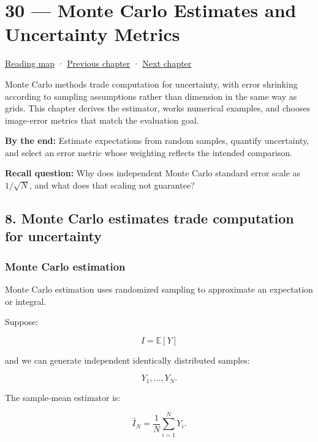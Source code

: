 \hypertarget{02-foundations-ii-ch030}{}
\chapter{30 --- Monte Carlo Estimates and Uncertainty Metrics}\label{02-foundations-ii-ch030-monte-carlo-estimates-and-uncertainty-metrics}

\hyperref[volume-reading-map]{Reading map} · \hyperref[02-foundations-ii-ch029-discretization-convergence-and-experimental-design]{Previous chapter} · \hyperref[02-foundations-ii-ch031-implement-probability-with-numerical-contracts]{Next chapter}

Monte Carlo methods trade computation for uncertainty, with error shrinking according to sampling assumptions rather than dimension in the same way as grids. This chapter derives the estimator, works numerical examples, and chooses image-error metrics that match the evaluation goal.

\textbf{By the end:} Estimate expectations from random samples, quantify uncertainty, and select an error metric whose weighting reflects the intended comparison.

\textbf{Recall question:} Why does independent Monte Carlo standard error scale as \(1/\sqrt{N}\), and what does that scaling not guarantee?

\section{8. Monte Carlo estimates trade computation for uncertainty}\label{02-foundations-ii-ch030-monte-carlo-estimates-trade-computation-for-uncertainty}

\subsection{Monte Carlo estimation}\label{02-foundations-ii-ch030-monte-carlo-estimation}

Monte Carlo estimation uses randomized sampling to approximate an expectation or integral.

Suppose:

\[
 I=\mathbb E[Y]
\]

and we can generate independent identically distributed samples:

\[
 Y_1,\ldots,Y_N.
\]

The sample-mean estimator is:

\[
 \boxed{ \widehat I_N= \frac1N\sum_{i=1}^NY_i }.
\]

